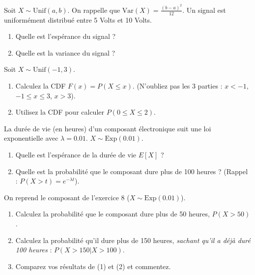\begin{exercicebox}
Soit $X \sim \text{Unif}(a, b)$. On rappelle que $\text{Var}(X) = \frac{(b-a)^2}{12}$.
Un signal est uniformément distribué entre 5 Volts et 10 Volts.
\begin{enumerate}
    \item Quelle est l'espérance du signal ?
    \item Quelle est la variance du signal ?
\end{enumerate}
\end{exercicebox}

\begin{exercicebox}
Soit $X \sim \text{Unif}(-1, 3)$.
\begin{enumerate}
    \item Calculez la CDF $F(x) = P(X \le x)$. (N'oubliez pas les 3 parties : $x < -1$, $-1 \le x \le 3$, $x > 3$).
    \item Utilisez la CDF pour calculer $P(0 \le X \le 2)$.
\end{enumerate}
\end{exercicebox}


\begin{exercicebox}
La durée de vie (en heures) d'un composant électronique suit une loi exponentielle avec $\lambda = 0.01$. $X \sim \text{Exp}(0.01)$.
\begin{enumerate}
    \item Quelle est l'espérance de la durée de vie $E[X]$ ?
    \item Quelle est la probabilité que le composant dure plus de 100 heures ? (Rappel : $P(X > t) = e^{-\lambda t}$).
\end{enumerate}
\end{exercicebox}

\begin{exercicebox}
On reprend le composant de l'exercice 8 ($X \sim \text{Exp}(0.01)$).
\begin{enumerate}
    \item Calculez la probabilité que le composant dure plus de 50 heures, $P(X > 50)$.
    \item Calculez la probabilité qu'il dure plus de 150 heures, \textit{sachant qu'il a déjà duré 100 heures} : $P(X > 150 | X > 100)$.
    \item Comparez vos résultats de (1) et (2) et commentez.
\end{enumerate}
\end{exercicebox}

